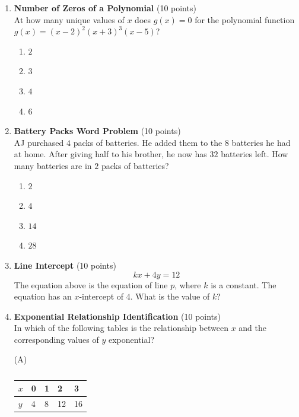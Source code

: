 \begin{enumerate}
  \item \textbf{Number of Zeros of a Polynomial} (10 points)\\
  At how many unique values of $x$ does $g(x) = 0$ for the polynomial function 
  $g(x) = (x-2)^2(x+3)^3(x-5)$?
  \begin{enumerate}[label=(\Alph*)]
    \item $2$
    \item $3$
    \item $4$
    \item $6$
  \end{enumerate}
  \begin{subanswer}
  \end{subanswer}

  \item \textbf{Battery Packs Word Problem} (10 points)\\
  AJ purchased $4$ packs of batteries. He added them to the $8$ batteries he had at home. 
  After giving half to his brother, he now has $32$ batteries left. How many batteries are 
  in $2$ packs of batteries?
  \begin{enumerate}[label=(\Alph*)]
    \item $2$
    \item $4$
    \item $14$
    \item $28$
  \end{enumerate}
  \begin{subanswer}
  \end{subanswer}





  \newpage


  \item \textbf{Line Intercept} (10 points)\\
  \[
  k x + 4 y = 12
  \]
  The equation above is the equation of line $p$, where $k$ is a constant. The equation has an $x$-intercept of $4$. What is the value of $k$?
  \begin{subanswer}
  \end{subanswer}


  \item \textbf{Exponential Relationship Identification} (10 points)\\
  In which of the following tables is the relationship between $x$ and the corresponding values of $y$ exponential?


  \medskip
  \noindent (A)
  \begin{table}[h!]
  \centering
  \renewcommand{\arraystretch}{1.3}
  \setlength{\tabcolsep}{14pt}
  \caption*{}
  \begin{tabular}{|l|l|l|l|l|}
  \hline
  \rowcolor[HTML]{E0E0E0}
  $x$ & 0 & 1 & 2 & 3 \\
  \hline
  $y$ & 4 & 8 & 12 & 16 \\
  \hline
  \end{tabular}
  \end{table}


\end{enumerate}
